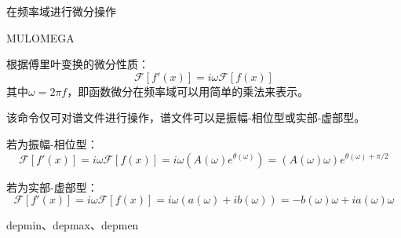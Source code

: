 \label{cmd:mulomega}

在频率域进行微分操作

\begin{SACSTX}
MULOMEGA
\end{SACSTX}

根据傅里叶变换的微分性质：
\[
\mathcal{F}[f'(x)]= i \omega \mathcal{F}[f(x)]
\]
其中$\omega = 2 \pi f $，即函数微分在频率域可以用简单的乘法来表示。

该命令仅可对谱文件进行操作，谱文件可以是振幅-相位型或实部-虚部型。

若为振幅-相位型：
\[
\mathcal{F}[f'(x)]= i \omega \mathcal{F}[f(x)] = i \omega (A(\omega)e^{\theta(\omega)})
    = (A(\omega)\omega)e^{\theta(\omega)+\pi/2}
\]

若为实部-虚部型：
\[
\mathcal{F}[f'(x)]= i \omega \mathcal{F}[f(x)] = i \omega (a(\omega)+ib(\omega))
    = -b(\omega)\omega+ia(\omega)\omega
\]

depmin、depmax、depmen
